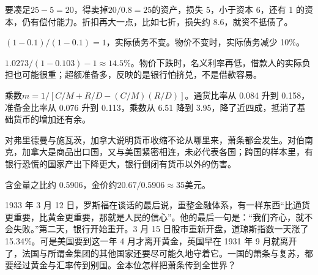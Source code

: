 \begin{answers}
\item 要凑足$25-5=20$，得卖掉$20/0.8=25$的资产，损失 5，小于资本 6，还有 1 的资本，仍有偿付能力。折扣再大一点，比如七折，损失约 8.6，就资不抵债了。
\item $(1-0.1)/(1-0.1)=1$，实际债务不变。物价不变时，实际债务减少 10\%。
\item $1.0273/(1-0.103)-1\approx14.5\%$。物价下跌时，名义利率再低，借款人的实际负担也可能很重；超额准备多，反映的是银行怕挤兑，不是借款容易。
\item 乘数$m=1/[C/M+R/D-(C/M)(R/D)]$。通货比率从 0.084 升到 0.158，准备金比率从 0.076 升到 0.113，乘数从 6.51 降到 3.95，降了近四成，抵消了基础货币的增加还有余。
\item 对弗里德曼与施瓦茨，加拿大说明货币收缩不论从哪里来，萧条都会发生。对伯南克，加拿大是商品出口国，又与美国紧密相连，未必代表各国；跨国的样本里，有银行恐慌的国家产出下降更大，银行倒闭有货币以外的伤害。
\item 含金量之比约 0.5906，金价约$20.67/0.5906\approx35$美元。
\end{answers}

1933 年 3 月 12 日，罗斯福在谈话的最后说，重整金融体系，有一样东西“比通货更重要，比黄金更重要，那就是人民的信心”。他的最后一句是：“我们齐心，就不会失败。”\cite{fdr1933}第二天，银行开始重开。3 月 15 日股市重新开盘，道琼斯指数一天涨了 15.34\%\cite{frheba}。可是美国要到这一年 4 月才离开黄金，英国早在 1931 年 9 月就离开了，法国与所谓金集团的其他国家还要尽可能久地守着它\cite{bernanke2002}。一国的萧条与复苏，都要经过黄金与汇率传到别国。金本位怎样把萧条传到全世界？
